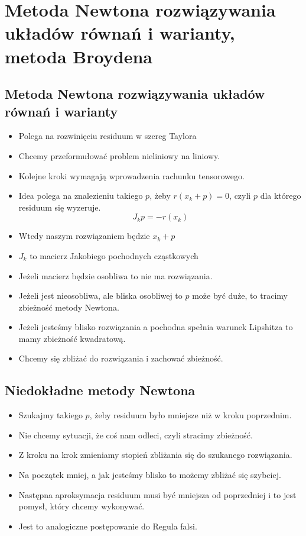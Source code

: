 \documentclass[a4paper]{article}
\begin{document}
\section{Metoda Newtona rozwiązywania układów równań i warianty, metoda Broydena}

\subsection{Metoda Newtona rozwiązywania układów równań i warianty}
\begin{itemize}
    \item Polega na rozwinięciu residuum w szereg Taylora
    \item Chcemy przeformułować problem nieliniowy na liniowy.
    \item Kolejne kroki wymagają wprowadzenia rachunku tensorowego.
    \item Idea polega na znalezieniu takiego $p$, żeby $r(x_k+p) = 0$, czyli $p$ dla którego residuum się wyzeruje.
    \begin{equation*}
        J_kp=-r(x_k)
    \end{equation*}
    \item Wtedy naszym rozwiązaniem będzie $x_k + p$
    \item $J_k$ to macierz Jakobiego pochodnych cząstkowych
    \item Jeżeli macierz będzie osobliwa to nie ma rozwiązania.
    \item Jeżeli jest nieosobliwa, ale bliska osobliwej to $p$ może być duże, to tracimy zbieżność metody Newtona.
    \item Jeżeli jesteśmy blisko rozwiązania a pochodna spełnia warunek Lipshitza to mamy zbieżność kwadratową.
    \item Chcemy się zbliżać do rozwiązania i zachować zbieżność.
\end{itemize}

\subsection{Niedokładne metody Newtona}
\begin{itemize}
    \item Szukajmy takiego $p$, żeby residuum było mniejsze niż w kroku poprzednim.
    \item Nie chcemy sytuacji, że coś nam odleci, czyli stracimy zbieżność.
    \item Z kroku na krok zmieniamy stopień zbliżania się do szukanego rozwiązania.
    \item Na początek mniej, a jak jesteśmy blisko to możemy zbliżać się szybciej.
    \item Następna aproksymacja residuum musi być mniejsza od poprzedniej i to jest pomysł, który chcemy wykonywać.
    \item Jest to analogiczne postępowanie do Regula falsi.
\end{itemize}
\end{document}
